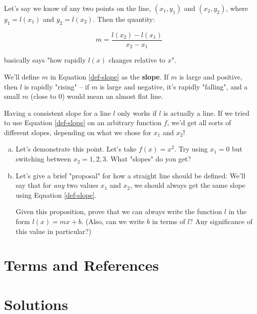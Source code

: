 Let's say we know of any two points on the line, $(x_1, y_1)$ and $(x_2, y_2)$, where $y_1 = l(x_1)$ and $y_2 = l(x_2)$. Then the quantity:

\begin{equation}
\label{def-slope}
m = \frac{l(x_2) - l(x_1)}{x_2 - x_1}
\end{equation}

basically says "how rapidly $l(x)$ changes relative to $x$". 

We'll define $m$ in Equation \ref{def-slope} as the \textbf{slope}. If $m$ is large and positive, then $l$ is rapidly "rising" -- if $m$ is large and negative, it's rapidly "falling", and a small $m$ (close to 0) would mean an almost flat line.

\begin{exercise}
Having a consistent slope for a line $l$ only works if $l$ is actually a line. If we tried to use Equation \ref{def-slope} on an arbitrary function $f$, we'd get all sorts of different slopes, depending on what we chose for $x_1$ and $x_2$!

\vspace{2in}

\begin{enumerate}[(a)]
\item Let's demonstrate this point. Let's take $f(x) = x^2$. Try using $x_1 = 0$ but switching between $x_2 = 1, 2, 3$. What "slopes" do you get?

\item Let's give a brief "proposal" for how a straight line should be defined: We'll say that for \textit{any} two values $x_1$ and $x_2$, we should always get the same slope using Equation \ref{def-slope}. 

Given this proposition, prove that we can always write the function $l$ in the form $l(x) = mx + b$. (Also, can we write $b$ in terms of $l$? Any significance of this value in particular?)
\end{enumerate}
\end{exercise}



\newpage
\section{Terms and References}

\section{Solutions}

